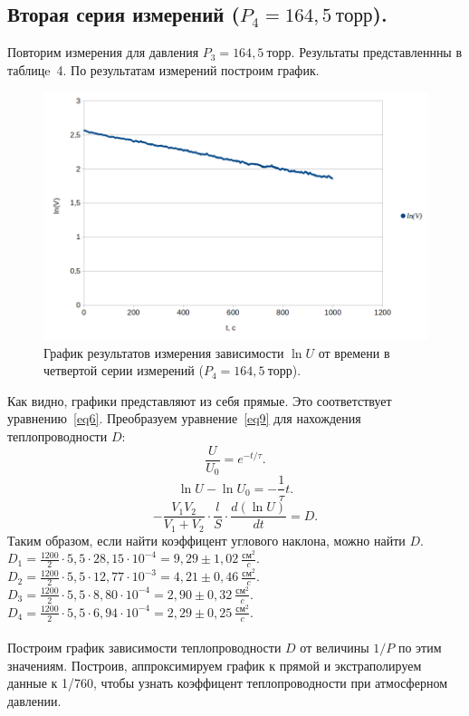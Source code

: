 \documentclass[a4paper,11pt]{article}
\begin{document}
\subsection{Вторая серия измерений ($P_{4} = 164,5\ торр$).}
Повторим измерения для давления $P_{3} = 164,5\ торр$. Результаты представленнны в таблицe~4.
По результатам измерений построим график.
\begin{figure}[h!]\label{fig:img4}
  \centering
  \includegraphics[scale = 0.4125]{graph4.png}
  \caption{График результатов измерения зависимости $\ln U$ от времени в четвертой серии измерений ($P_{4} = 164,5\ торр$).}
\end{figure}
Как видно, графики представляют из себя прямые. Это соответствует уравнению~\ref{eq6}. Преобразуем уравнение~\ref{eq9} для нахождения теплопроводности $D$:
\[\frac{U}{U_{0}} = e^{-t/\tau}.\]
\[\ln U - \ln U_{0} = -\frac{1}{\tau} t.\]
\[- \frac{V_{1}V_{2}}{V_{1} + V_{2}} \cdot \frac{l}{S} \cdot \frac{d (\ln U)}{dt} = D.\]
Таким образом, если найти коэффицент углового наклона, можно найти $D$.\newpage
\ \newline
$D_{1} = \frac{1200}{2} \cdot 5,5 \cdot 28,15 \cdot 10^{-4} = 9,29 \pm 1,02\ \frac{см^{2}}{c}.$\\
$D_{2} = \frac{1200}{2} \cdot 5,5 \cdot 12,77 \cdot 10^{-3} = 4,21 \pm 0,46\ \frac{см^{2}}{c}.$\\
$D_{3} = \frac{1200}{2} \cdot 5,5 \cdot 8,80 \cdot 10^{-4} = 2,90 \pm 0,32\ \frac{см^{2}}{c}.$\\
$D_{4} = \frac{1200}{2} \cdot 5,5 \cdot 6,94 \cdot 10^{-4} = 2,29 \pm 0,25\ \frac{см^{2}}{c}.$\\ \\
Построим график зависимости теплопроводности $D$ от величины $1/P$ по этим значениям. Построив, аппроксимируем график к прямой и экстраполируем данные к 1/760, чтобы узнать коэффицент теплопроводности при атмосферном давлении.
\end{document}

